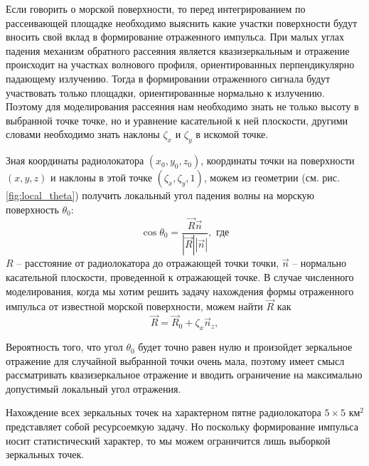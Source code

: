 Если говорить о морской поверхности, то перед интегрированием по рассеивающей
площадке необходимо выяснить какие участки поверхности будут вносить свой вклад
в формирование отраженного импульса.  При малых углах падения механизм обратного  рассеяния является квазизеркальным и отражение происходит на участках волнового профиля, ориентированных
перпендикулярно падающему излучению. Тогда в формировании отраженного сигнала
будут участвовать только площадки, ориентированные нормально к излучению. 
Поэтому для моделирования рассеяния нам необходимо знать не только высоту
в выбранной точке точке, но и уравнение касательной к ней плоскости, другими словами необходимо знать наклоны $\zeta_x$ и  $\zeta_y$ в искомой точке.


Зная координаты радиолокатора  $(x_0,y_0,z_0)$, координаты точки на
поверхности $(x,y,z)$ и наклоны в этой точке $(\zeta_x,\zeta_y,1)$, можем из
геометрии (см. рис. \ref{fig:local_theta}) получить локальный угол падения
волны на морскую поверхность $\theta_0$:
\begin{equation}
    \label{eq:local_theta}
    \cos \theta_0 =  \frac{\vec R \vec n}{|\vec R| |\vec n|}, \text{ где}
\end{equation}
$R$ -- расстояние от радиолокатора до отражающей точки точки,
 $\vec n$ -- нормально касательной плоскости, проведенной к отражающей точке.
 В случае численного моделирования, когда мы хотим решить задачу нахождения
 формы отраженного импульса от известной морской поверхности, можем найти
 $\vec R$ как
 \begin{equation}
     \label{eq:R_1}
     \vec R = \vec R_0 + \zeta_x \vec n_z,
 \end{equation}




Вероятность того, что угол $\theta_0$ будет точно равен нулю и произойдет
зеркальное отражение для случайной выбранной точки очень мала, поэтому имеет
смысл рассматривать квазизеркальное отражение и вводить ограничение на
максимально допустимый локальный угол отражения. 

Нахождение всех зеркальных точек на характерном пятне радиолокатора  $5\times
5 \text{ км}^2$ представляет собой ресурсоемкую задачу. Но поскольку формирование
импульса носит статистический характер, то мы можем ограничится лишь выборкой зеркальных точек. 




